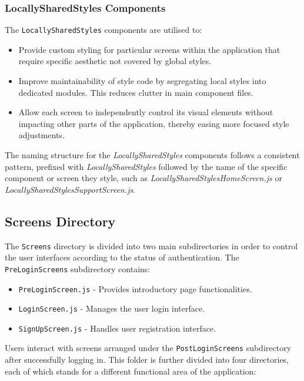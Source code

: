 \subsubsection{LocallySharedStyles Components}

The \texttt{LocallySharedStyles} components are utilised to:
\begin{itemize}
    \item Provide custom styling for particular screens within the application that require specific aesthetic not covered by global styles.
    \item Improve maintainability of style code by segregating local styles into dedicated modules. This reduces clutter in main component files.
    \item Allow each screen to independently control its visual elements without impacting other parts of the application, thereby easing more focused style adjustments.
\end{itemize}

The naming structure for the \textit{LocallySharedStyles} components follows a consistent pattern, prefixed with \textit{LocallySharedStyles} followed by the name of the specific component or screen they style, such as \textit{LocallySharedStylesHomeScreen.js} or \textit{LocallySharedStylesSupportScreen.js}. 

\subsection{Screens Directory}

The \texttt{Screens} directory is divided into two main subdirectories in order to control the user interfaces according to the status of authentication. The \texttt{PreLoginScreens} subdirectory contains:

\begin{itemize}
    \item \texttt{PreLoginScreen.js} - Provides introductory page functionalities.
    \item \texttt{LoginScreen.js} - Manages the user login interface.
    \item \texttt{SignUpScreen.js} - Handles user registration interface.
\end{itemize}

Users interact with screens arranged under the \texttt{PostLoginScreens} subdirectory after successfully logging in. This folder is further divided into four directories, each of which stands for a different functional area of the application:

